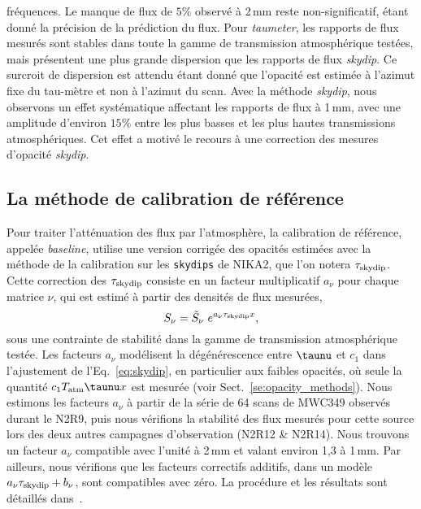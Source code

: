fréquences. Le manque de flux de $5\%$ observé à 2\,mm reste
non-significatif, étant donné la précision de la prédiction du
flux. Pour \emph{taumeter}, les rapports de flux mesurés sont stables
dans toute la gamme de transmission atmosphérique testées, mais
présentent une plus grande dispersion que les rapports de flux
\emph{skydip}. Ce surcroit de dispersion est attendu étant donné que
l'opacité est estimée à l'azimut fixe du tau-mètre et non à l'azimut
du scan. Avec la méthode \emph{skydip}, nous observons un effet
systématique affectant les rapports de flux à 1\,mm, avec une
amplitude d'environ $15\%$ entre les
plus basses et les plus hautes transmissions atmosphériques. Cet effet
a motivé le recours à une correction des mesures d'opacité
\emph{skydip}.


\subsection{La méthode de calibration de référence}
\label{se:baseline_calibration}

Pour traiter l'atténuation des flux par l'atmosphère, la
calibration de référence, appelée \emph{baseline}, utilise une version
corrigée des opacités estimées avec la méthode de la calibration sur
les {\tt skydips} de NIKA2, que l'on notera
$\tau_{\rm{skydip}}$. Cette correction des $\tau_{\rm{skydip}}$
consiste en un facteur multiplicatif $a_\nu$ pour chaque matrice
$\nu$, qui est estimé à partir des densités de flux mesurées,
\begin{equation}
  S_\nu = \tilde{S}_\nu \,\,  e^{a_\nu \tau_{\rm{skydip}} x},
\end{equation}
sous une contrainte de stabilité dans la gamme de transmission
atmosphérique testée. Les facteurs $a_\nu$ modélisent la dégénérescence
entre $\taunu$ et $c_1$ dans l'ajustement de l'Eq.~\ref{eq:skydip}, en
particulier aux faibles opacités, où seule la quantité $c_1
T_{\rm{atm}} \taunu x$ est mesurée (voir Sect.~\ref{se:opacity_methods}). Nous
estimons les facteurs $a_\nu$ à partir de la série de 64 scans de
MWC349 observés durant le N2R9, puis nous vérifions la stabilité des
flux mesurés pour cette source lors des deux autres campagnes
d'observation (N2R12 \& N2R14). Nous trouvons un facteur $a_\nu$
compatible avec l'unité à 2\,mm et valant environ 1,3 à 1\,mm. Par
ailleurs, nous vérifions que les facteurs correctifs additifs, dans un
modèle $a_\nu\tau_{\rm{skydip}} + b_\nu$, sont compatibles avec zéro. La
procédure et les résultats sont détaillés dans~\citet{Perotto2019}.

